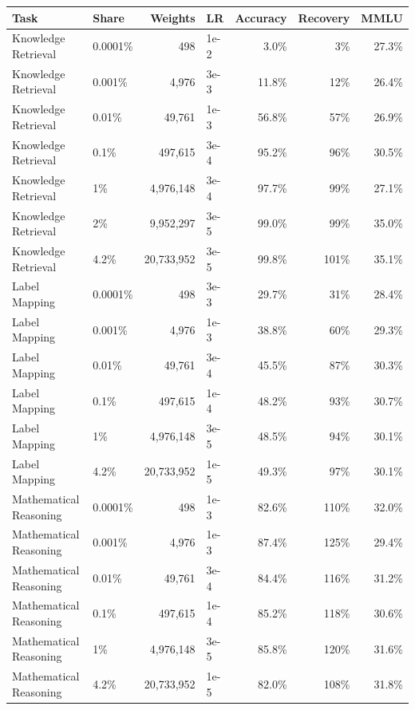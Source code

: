 \begin{tabular}{llrlrrr}
\toprule
Task & Share & Weights & LR & Accuracy & Recovery & MMLU \\
\midrule
Knowledge Retrieval & 0.0001\% & 498 & 1e-2 & 3.0\% & 3\% & 27.3\% \\
Knowledge Retrieval & 0.001\% & 4,976 & 3e-3 & 11.8\% & 12\% & 26.4\% \\
Knowledge Retrieval & 0.01\% & 49,761 & 1e-3 & 56.8\% & 57\% & 26.9\% \\
Knowledge Retrieval & 0.1\% & 497,615 & 3e-4 & 95.2\% & 96\% & 30.5\% \\
Knowledge Retrieval & 1\% & 4,976,148 & 3e-4 & 97.7\% & 99\% & 27.1\% \\
Knowledge Retrieval & 2\% & 9,952,297 & 3e-5 & 99.0\% & 99\% & 35.0\% \\
Knowledge Retrieval & 4.2\% & 20,733,952 & 3e-5 & 99.8\% & 101\% & 35.1\% \\
\midrule
Label Mapping & 0.0001\% & 498 & 3e-3 & 29.7\% & 31\% & 28.4\% \\
Label Mapping & 0.001\% & 4,976 & 1e-3 & 38.8\% & 60\% & 29.3\% \\
Label Mapping & 0.01\% & 49,761 & 3e-4 & 45.5\% & 87\% & 30.3\% \\
Label Mapping & 0.1\% & 497,615 & 1e-4 & 48.2\% & 93\% & 30.7\% \\
Label Mapping & 1\% & 4,976,148 & 3e-5 & 48.5\% & 94\% & 30.1\% \\
Label Mapping & 4.2\% & 20,733,952 & 1e-5 & 49.3\% & 97\% & 30.1\% \\
\midrule
Mathematical Reasoning & 0.0001\% & 498 & 1e-3 & 82.6\% & 110\% & 32.0\% \\
Mathematical Reasoning & 0.001\% & 4,976 & 1e-3 & 87.4\% & 125\% & 29.4\% \\
Mathematical Reasoning & 0.01\% & 49,761 & 3e-4 & 84.4\% & 116\% & 31.2\% \\
Mathematical Reasoning & 0.1\% & 497,615 & 1e-4 & 85.2\% & 118\% & 30.6\% \\
Mathematical Reasoning & 1\% & 4,976,148 & 3e-5 & 85.8\% & 120\% & 31.6\% \\
Mathematical Reasoning & 4.2\% & 20,733,952 & 1e-5 & 82.0\% & 108\% & 31.8\% \\
\bottomrule
\end{tabular}
